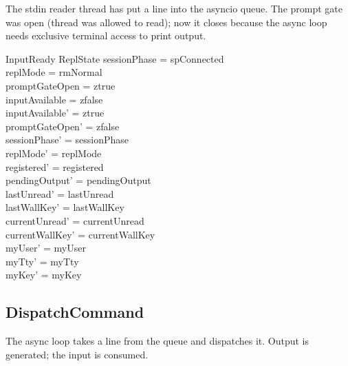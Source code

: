 \documentclass[a4paper,10pt,fleqn]{article}
\begin{document}
The stdin reader thread has put a line into the asyncio queue.
The prompt gate was open (thread was allowed to read); now it
closes because the async loop needs exclusive terminal access to
print output.

\begin{schema}{InputReady}
  \Delta ReplState
\where
  sessionPhase = spConnected \\
  replMode = rmNormal \\
  promptGateOpen = ztrue \\
  inputAvailable = zfalse \\
  inputAvailable' = ztrue \\
  promptGateOpen' = zfalse \\
  sessionPhase' = sessionPhase \\
  replMode' = replMode \\
  registered' = registered \\
  pendingOutput' = pendingOutput \\
  lastUnread' = lastUnread \\
  lastWallKey' = lastWallKey \\
  currentUnread' = currentUnread \\
  currentWallKey' = currentWallKey \\
  myUser' = myUser \\
  myTty' = myTty \\
  myKey' = myKey
\end{schema}

\subsection{DispatchCommand}

The async loop takes a line from the queue and dispatches it.
Output is generated; the input is consumed.
\end{document}
